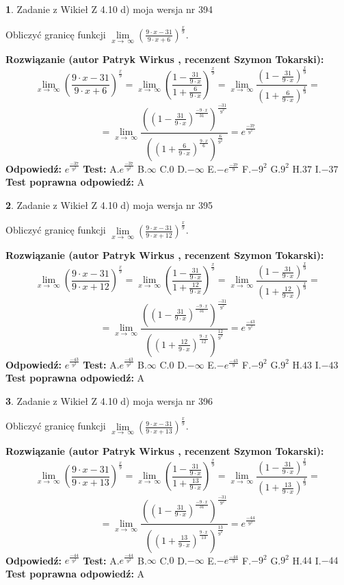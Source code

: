\documentclass[12pt, a4paper]{article}
\theoremstyle{definition} %
\newtheorem{zad}{}
\newcommand{\zadStart}[1]{\begin{zad}#1\newline}
\newcommand{\zadStop}{\end{zad}}
\newcommand{\rozwStart}[2]{\noindent \textbf{Rozwiązanie (autor #1 , recenzent #2): }\newline}
\newcommand{\rozwStop}{\newline}
\newcommand{\odpStart}{\noindent \textbf{Odpowiedź:}\newline}
\newcommand{\odpStop}{\newline}
\newcommand{\testStart}{\noindent \textbf{Test:}\newline}
\newcommand{\testStop}{\newline}
\newcommand{\kluczStart}{\noindent \textbf{Test poprawna odpowiedź:}\newline}
\newcommand{\kluczStop}{\newline}
\begin{document}
\zadStart{Zadanie z Wikieł Z 4.10 d) moja wersja nr 394}


Obliczyć granicę funkcji  $\lim\limits_{x\to\ \infty}(\frac{9\cdot x-31}{9\cdot x+6})^{\frac{x}{9}}$.
\zadStop
\rozwStart{Patryk Wirkus}{Szymon Tokarski}
$$\lim\limits_{x\to\ \infty}(\frac{9\cdot x-31}{9\cdot x+6})^{\frac{x}{9}} = \lim\limits_{x\to\ \infty}(\frac{1-\frac{31}{9\cdot x}}{1+\frac{6}{9\cdot x}})^{\frac{x}{9}}=\lim\limits_{x\to\ \infty}\frac{(1-\frac{31}{9\cdot x})^{\frac{x}{9}}}{(1+\frac{6}{9\cdot x})^{\frac{x}{9}}}=$$
$$=\lim\limits_{x\to\ \infty}\frac{((1-\frac{31}{9\cdot x})^{\frac{-9\cdot x}{31}})^{\frac{-31}{9^{2}}}}{((1+\frac{6}{9\cdot x})^{\frac{9\cdot x}{6}})^{\frac{6}{9^{2}}}}=e^{\frac{-37}{9^{2}}}$$
\rozwStop
\odpStart
$e^{\frac{-37}{9^{2}}}$
\odpStop
\testStart
A.$e^{\frac{-37}{9^{2}}}$ B.$\infty$ C.$0$ D.$-\infty$ E.$-e^{\frac{-37}{9}}$
F.$-9^{2}$ G.$9^{2}$
H.$37$
I.$-37$
\testStop
\kluczStart
A
\kluczStop



\zadStart{Zadanie z Wikieł Z 4.10 d) moja wersja nr 395}


Obliczyć granicę funkcji  $\lim\limits_{x\to\ \infty}(\frac{9\cdot x-31}{9\cdot x+12})^{\frac{x}{9}}$.
\zadStop
\rozwStart{Patryk Wirkus}{Szymon Tokarski}
$$\lim\limits_{x\to\ \infty}(\frac{9\cdot x-31}{9\cdot x+12})^{\frac{x}{9}} = \lim\limits_{x\to\ \infty}(\frac{1-\frac{31}{9\cdot x}}{1+\frac{12}{9\cdot x}})^{\frac{x}{9}}=\lim\limits_{x\to\ \infty}\frac{(1-\frac{31}{9\cdot x})^{\frac{x}{9}}}{(1+\frac{12}{9\cdot x})^{\frac{x}{9}}}=$$
$$=\lim\limits_{x\to\ \infty}\frac{((1-\frac{31}{9\cdot x})^{\frac{-9\cdot x}{31}})^{\frac{-31}{9^{2}}}}{((1+\frac{12}{9\cdot x})^{\frac{9\cdot x}{12}})^{\frac{12}{9^{2}}}}=e^{\frac{-43}{9^{2}}}$$
\rozwStop
\odpStart
$e^{\frac{-43}{9^{2}}}$
\odpStop
\testStart
A.$e^{\frac{-43}{9^{2}}}$ B.$\infty$ C.$0$ D.$-\infty$ E.$-e^{\frac{-43}{9}}$
F.$-9^{2}$ G.$9^{2}$
H.$43$
I.$-43$
\testStop
\kluczStart
A
\kluczStop



\zadStart{Zadanie z Wikieł Z 4.10 d) moja wersja nr 396}


Obliczyć granicę funkcji  $\lim\limits_{x\to\ \infty}(\frac{9\cdot x-31}{9\cdot x+13})^{\frac{x}{9}}$.
\zadStop
\rozwStart{Patryk Wirkus}{Szymon Tokarski}
$$\lim\limits_{x\to\ \infty}(\frac{9\cdot x-31}{9\cdot x+13})^{\frac{x}{9}} = \lim\limits_{x\to\ \infty}(\frac{1-\frac{31}{9\cdot x}}{1+\frac{13}{9\cdot x}})^{\frac{x}{9}}=\lim\limits_{x\to\ \infty}\frac{(1-\frac{31}{9\cdot x})^{\frac{x}{9}}}{(1+\frac{13}{9\cdot x})^{\frac{x}{9}}}=$$
$$=\lim\limits_{x\to\ \infty}\frac{((1-\frac{31}{9\cdot x})^{\frac{-9\cdot x}{31}})^{\frac{-31}{9^{2}}}}{((1+\frac{13}{9\cdot x})^{\frac{9\cdot x}{13}})^{\frac{13}{9^{2}}}}=e^{\frac{-44}{9^{2}}}$$
\rozwStop
\odpStart
$e^{\frac{-44}{9^{2}}}$
\odpStop
\testStart
A.$e^{\frac{-44}{9^{2}}}$ B.$\infty$ C.$0$ D.$-\infty$ E.$-e^{\frac{-44}{9}}$
F.$-9^{2}$ G.$9^{2}$
H.$44$
I.$-44$
\testStop
\kluczStart
A
\kluczStop
\end{document}
